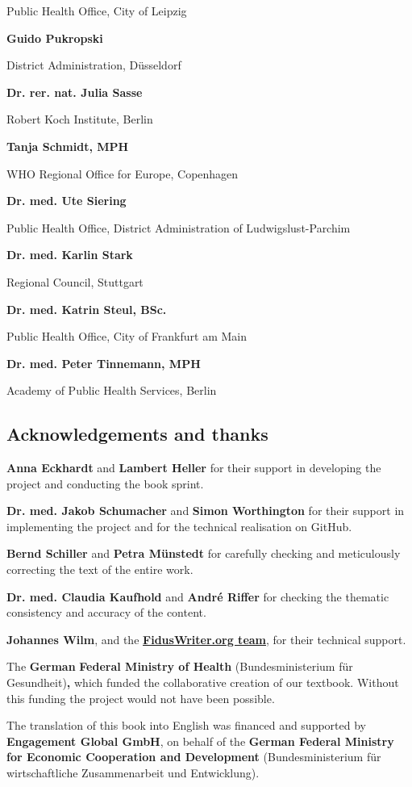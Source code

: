 \documentclass{article}
\begin{document}
Public Health Office, City of Leipzig


\textbf{Guido Pukropski}

District Administration, Düsseldorf


\textbf{Dr. rer. nat. Julia Sasse}

Robert Koch Institute, Berlin


\textbf{Tanja Schmidt, MPH}

WHO Regional Office for Europe, Copenhagen


\textbf{Dr. med. Ute Siering}

Public Health Office, District Administration of Ludwigslust-Parchim


\textbf{Dr. med. Karlin Stark}

Regional Council, Stuttgart


\textbf{Dr. med. Katrin Steul, BSc.}

Public Health Office, City of Frankfurt am Main


\textbf{Dr. med. Peter Tinnemann, MPH}

Academy of Public Health Services, Berlin




\subsection{Acknowledgements and thanks}\label{H6834922}



\textbf{Anna Eckhardt }and\textbf{ Lambert Heller }for their support in\textbf{ }developing the project and conducting the book sprint.


\textbf{Dr. med. Jakob Schumacher }and\textbf{ Simon Worthington }for their support in\textbf{ }implementing the project and for the technical realisation on GitHub.


\textbf{Bernd Schiller }and\textbf{ Petra Münstedt }for carefully checking and meticulously correcting the text of the\textbf{ }entire work.


\textbf{Dr. med. Claudia Kaufhold }and\textbf{ André Riffer }for checking the thematic consistency and accuracy of the content.


\textbf{Johannes Wilm}, and the\textbf{ }\textbf{\href{https://www.fiduswriter.org/who-we-are/}{FidusWriter.org team}},\textbf{ }for their technical\textbf{ }support.


The \textbf{German} \textbf{Federal Ministry of Health }(Bundesministerium für Gesundheit)\textbf{,} which funded the collaborative creation of our textbook. Without this funding the project would not have been possible.


The translation of this book into English was financed and supported by \textbf{Engagement Global GmbH}, on behalf of the \textbf{German Federal Ministry for Economic Cooperation and Development} (Bundesministerium für wirtschaftliche Zusammenarbeit und Entwicklung).
\end{document}
